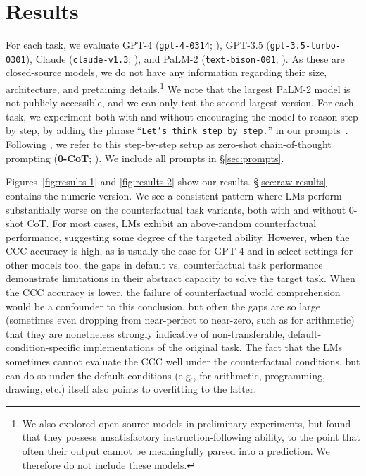 \section{Results} \label{sec:results}
\vspace{-1mm}
For each task, we evaluate GPT-4 (\texttt{gpt-4-0314}; \citealp{gpt4}), GPT-3.5 (\texttt{gpt-3.5-turbo-0301}), Claude (\texttt{claude-v1.3}; \citealp{claude}), and PaLM-2 (\texttt{text-bison-001}; \citealp{palm2}). As these are closed-source models, we do not have any information regarding their size, architecture, and pretaining details.\footnote{We also explored open-source models in preliminary experiments, but found that they possess unsatisfactory instruction-following ability, to the point that often their output cannot be meaningfully parsed into a prediction. We therefore do not include these models.} We note that the largest PaLM-2 model is not publicly accessible, and we can only test the second-largest version.
For each task, we experiment both with and without encouraging the model to reason step by step, by adding the phrase ``\texttt{Let's think step by step.}'' in our prompts~\citep{kojima2023large,Reynolds2021prompt}. Following \citet{kojima2023large}, we refer to this step-by-step setup as zero-shot chain-of-thought prompting (\textbf{0-CoT}; \citealp{nye2021work,wei2022chain}).
We include all  prompts in \S\ref{sec:prompts}.

Figures~\ref{fig:results-1} and \ref{fig:results-2} show our results. 
\S\ref{sec:raw-results} contains the numeric version.
We see a consistent pattern where LMs perform substantially worse on the counterfactual task variants, both with and without 0-shot CoT. For most cases, LMs exhibit an above-random counterfactual performance, suggesting some degree of the targeted ability. However, when the CCC accuracy is high, as is usually the case for GPT-4 and in select settings for other models too, the gaps in default vs. counterfactual task performance demonstrate limitations in their abstract capacity to solve the target task.
When the CCC accuracy is lower, the failure of counterfactual world comprehension would be a confounder to this conclusion, but often the gaps are so large (sometimes even dropping from near-perfect to near-zero, such as for arithmetic) that they are nonetheless strongly indicative of non-transferable, default-condition-specific implementations of the original task. The fact that the LMs sometimes cannot evaluate the CCC well under the counterfactual conditions, but can do so under the default conditions (e.g., for arithmetic, programming, drawing, etc.) itself also points to overfitting to the latter.
